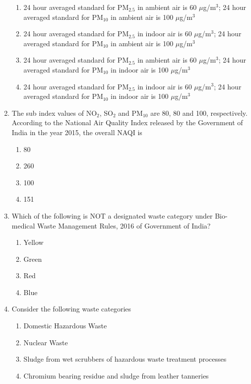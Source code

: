 \documentclass[journal,12pt,onecolumn]{IEEEtran}
\theoremstyle{remark}
\begin{document}
\begin{enumerate}
\begin{enumerate}
\item 24 hour averaged standard for PM$_{2.5}$ in ambient air is 60 $\mu$g/m$^3$; 24 hour averaged standard for PM$_{10}$ in ambient air is 100 $\mu$g/m$^3$
\item 24 hour averaged standard for PM$_{2.5}$ in indoor air is 60 $\mu$g/m$^3$; 24 hour averaged standard for PM$_{10}$ in ambient air is 100 $\mu$g/m$^3$
\item 24 hour averaged standard for PM$_{2.5}$ in ambient air is 60 $\mu$g/m$^3$; 24 hour averaged standard for PM$_{10}$ in indoor air is 100 $\mu$g/m$^3$
\item 24 hour averaged standard for PM$_{2.5}$ in indoor air is 60 $\mu$g/m$^3$; 24 hour averaged standard for PM$_{10}$ in indoor air is 100 $\mu$g/m$^3$
\end{enumerate}
\hfill{}
\item The sub index values of NO$_2$, SO$_2$ and PM$_{10}$ are 80, 80 and 100, respectively. According to the National Air Quality Index  released by the Government of India in the year 2015, the overall NAQI is

\begin{enumerate}
\item 80
\item 260
\item 100
\item 151
\end{enumerate}
\hfill{}

\item Which of the following is NOT a designated waste category under Bio-medical Waste Management Rules, 2016 of Government of India?

\begin{enumerate}
\item Yellow
\item Green
\item Red
\item Blue
\end{enumerate}
\hfill{}

\item Consider the following waste categories

\begin{enumerate}[label=\roman*.]
\item Domestic Hazardous Waste
\item Nuclear Waste
\item Sludge from wet scrubbers of hazardous waste treatment processes
\item Chromium bearing residue and sludge from leather tanneries
\end{enumerate}


\end{enumerate}
\end{document}
